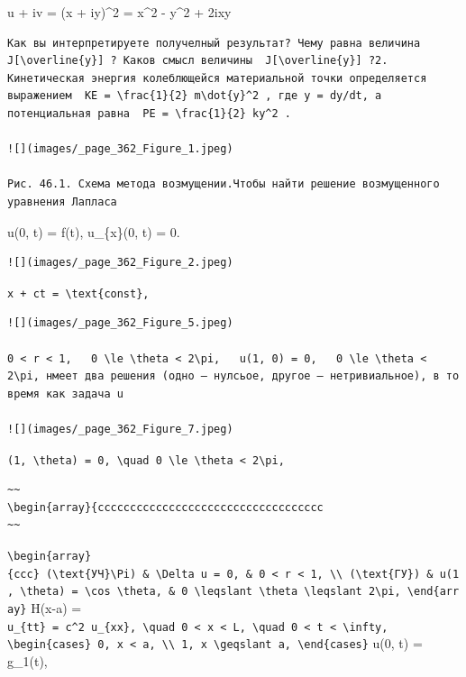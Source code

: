\documentclass[
  ukrainian,
]{article}
\begin{document}
u + iv = (x + iy)\^{}2 = x\^{}2 - y\^{}2 + 2ixy

\begin{verbatim}
Как вы интерпретируете получелный результат? Чему равна величина  J[\overline{y}] ? Каков смысл величины  J[\overline{y}] ?2. Кинетическая энергия колеблющейся материальной точки определяется выражением  KE = \frac{1}{2} m\dot{y}^2 , где y = dy/dt, а потенциальная равна  PE = \frac{1}{2} ky^2 .

![](images/_page_362_Figure_1.jpeg)

Рис. 46.1. Схема метода возмущении.Чтобы найти решение возмущенного уравнения Лапласа
\end{verbatim}

u(0, t) = f(t), u\_\{x\}(0, t) = 0.

\begin{verbatim}
![](images/_page_362_Figure_2.jpeg)
\end{verbatim}

\texttt{x\ +\ ct\ =\ \textbackslash{}text\{const\},}

\begin{verbatim}
![](images/_page_362_Figure_5.jpeg)

0 < r < 1,   0 \le \theta < 2\pi,   u(1, 0) = 0,   0 \le \theta < 2\pi, нмеет два решения (одно — нулсьое, другое — нетривиальное), в то время как задача u

![](images/_page_362_Figure_7.jpeg)
\end{verbatim}

\texttt{(1,\ \textbackslash{}theta)\ =\ 0,\ \textbackslash{}quad\ 0\ \textbackslash{}le\ \textbackslash{}theta\ \textless{}\ 2\textbackslash{}pi,}

\begin{verbatim}
~~
\begin{array}{ccccccccccccccccccccccccccccccccccc
~~
\end{verbatim}

\texttt{\textbackslash{}begin\{array\}\{ccc\}\ (\textbackslash{}text\{УЧ\}\textbackslash{}Pi)\ \&\ \textbackslash{}Delta\ u\ =\ 0,\ \&\ 0\ \textless{}\ r\ \textless{}\ 1,\ \textbackslash{}\textbackslash{}\ (\textbackslash{}text\{ГУ\})\ \&\ u(1,\ \textbackslash{}theta)\ =\ \textbackslash{}cos\ \textbackslash{}theta,\ \&\ 0\ \textbackslash{}leqslant\ \textbackslash{}theta\ \textbackslash{}leqslant\ 2\textbackslash{}pi,\ \textbackslash{}end\{array\}}
H(x-a) =
\texttt{u\_\{tt\}\ =\ c\^{}2\ u\_\{xx\},\ \textbackslash{}quad\ 0\ \textless{}\ x\ \textless{}\ L,\ \textbackslash{}quad\ 0\ \textless{}\ t\ \textless{}\ \textbackslash{}infty,}
\texttt{\textbackslash{}begin\{cases\}\ 0,\ x\ \textless{}\ a,\ \textbackslash{}\textbackslash{}\ 1,\ x\ \textbackslash{}geqslant\ a,\ \textbackslash{}end\{cases\}}
u(0, t) = g\_1(t),
\end{document}
